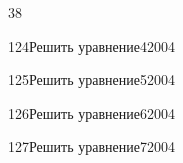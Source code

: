 \begin{TrigSourcePage}{38}
\begin{TrigExercise}{124}{Решить уравнение}{4}{2004}
\end{TrigExercise}
\begin{TrigExercise}{125}{Решить уравнение}{5}{2004}
\end{TrigExercise}
\begin{TrigExercise}{126}{Решить уравнение}{6}{2004}
\end{TrigExercise}
\begin{TrigExercise}{127}{Решить уравнение}{7}{2004}
\end{TrigExercise}
\end{TrigSourcePage}

